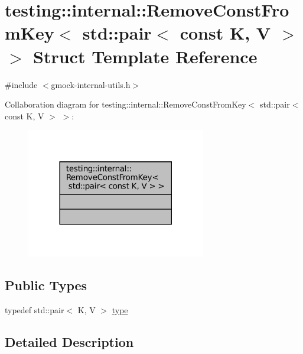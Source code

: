 \hypertarget{structtesting_1_1internal_1_1RemoveConstFromKey_3_01std_1_1pair_3_01const_01K_00_01V_01_4_01_4}{}\section{testing\+:\+:internal\+:\+:Remove\+Const\+From\+Key$<$ std\+:\+:pair$<$ const K, V $>$ $>$ Struct Template Reference}
\label{structtesting_1_1internal_1_1RemoveConstFromKey_3_01std_1_1pair_3_01const_01K_00_01V_01_4_01_4}


{\ttfamily \#include $<$gmock-\/internal-\/utils.\+h$>$}



Collaboration diagram for testing\+:\+:internal\+:\+:Remove\+Const\+From\+Key$<$ std\+:\+:pair$<$ const K, V $>$ $>$\+:
\nopagebreak
\begin{figure}[H]
\begin{center}
\leavevmode
\includegraphics[width=222pt]{structtesting_1_1internal_1_1RemoveConstFromKey_3_01std_1_1pair_3_01const_01K_00_01V_01_4_01_4__coll__graph}
\end{center}
\end{figure}
\subsection*{Public Types}
\begin{DoxyCompactItemize}
\item 
typedef std\+::pair$<$ K, V $>$ \hyperlink{structtesting_1_1internal_1_1RemoveConstFromKey_3_01std_1_1pair_3_01const_01K_00_01V_01_4_01_4_ac1d76274964aa8172889a4714246e86f}{type}
\end{DoxyCompactItemize}


\subsection{Detailed Description}
